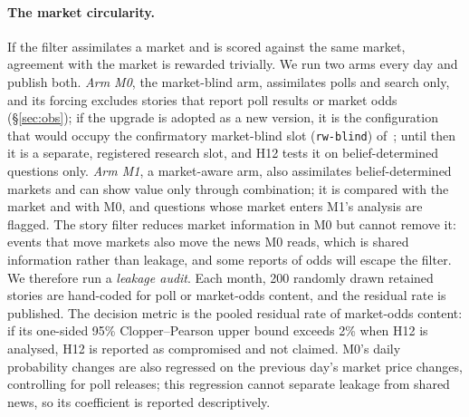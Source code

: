 \documentclass[10pt]{article}
\theoremstyle{remark}
\begin{document}
\paragraph{The market circularity.} If the filter assimilates a market and is scored against the same market, agreement with the market is rewarded trivially. We run two arms every day and publish both. \emph{Arm M0}, the market-blind arm, assimilates polls and search only, and its forcing excludes stories that report poll results or market odds (\S\ref{sec:obs}); if the upgrade is adopted as a new version, it is the configuration that would occupy the confirmatory market-blind slot (\texttt{rw-blind}) of~\cite{rw_receipts}; until then it is a separate, registered research slot, and H12 tests it on belief-determined questions only. \emph{Arm M1}, a market-aware arm, also assimilates belief-determined markets and can show value only through combination; it is compared with the market and with M0, and questions whose market enters M1's analysis are flagged. The story filter reduces market information in M0 but cannot remove it: events that move markets also move the news M0 reads, which is shared information rather than leakage, and some reports of odds will escape the filter. We therefore run a \emph{leakage audit}. Each month, 200 randomly drawn retained stories are hand-coded for poll or market-odds content, and the residual rate is published. The decision metric is the pooled residual rate of market-odds content: if its one-sided 95\% Clopper--Pearson upper bound exceeds 2\% when H12 is analysed, H12 is reported as compromised and not claimed. M0's daily probability changes are also regressed on the previous day's market price changes, controlling for poll releases; this regression cannot separate leakage from shared news, so its coefficient is reported descriptively.
\end{document}
